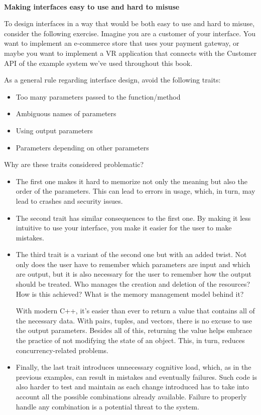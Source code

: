 \hspace*{\fill} \\ %
\noindent
\textbf{Making interfaces easy to use and hard to misuse}

To design interfaces in a way that would be both easy to use and hard to misuse, consider the following exercise. Imagine you are a customer of your interface. You want to implement an e-commerce store that uses your payment gateway, or maybe you want to implement a VR application that connects with the Customer API of the example system we've used throughout this book.

As a general rule regarding interface design, avoid the following traits:

\begin{itemize}
\item 
Too many parameters passed to the function/method

\item 
Ambiguous names of parameters

\item 
Using output parameters

\item 
Parameters depending on other parameters
\end{itemize}

Why are these traits considered problematic?

\begin{itemize}
\item 
The first one makes it hard to memorize not only the meaning but also the order of the parameters. This can lead to errors in usage, which, in turn, may lead to crashes and security issues.

\item 
The second trait has similar consequences to the first one. By making it less intuitive to use your interface, you make it easier for the user to make mistakes.

\item 
The third trait is a variant of the second one but with an added twist. Not only does the user have to remember which parameters are input and which are output, but it is also necessary for the user to remember how the output should be treated. Who manages the creation and deletion of the resources? How is this achieved? What is the memory management model behind it?

With modern C++, it's easier than ever to return a value that contains all of the necessary data. With pairs, tuples, and vectors, there is no excuse to use the output parameters. Besides all of this, returning the value helps embrace the practice of not modifying the state of an object. This, in turn, reduces concurrency-related problems.

\item 
Finally, the last trait introduces unnecessary cognitive load, which, as in the previous examples, can result in mistakes and eventually failures. Such code is also harder to test and maintain as each change introduced has to take into account all the possible combinations already available. Failure to properly handle any combination is a potential threat to the system.
\end{itemize}

